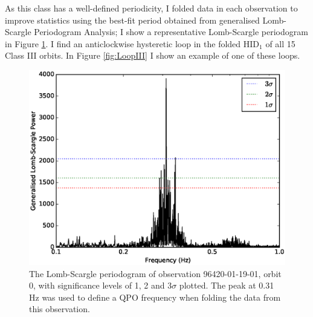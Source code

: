 \par As this class has a well-defined periodicity, I folded data in each observation to improve statistics using the best-fit period obtained from generalised Lomb-Scargle Periodogram Analysis; I show a representative Lomb-Scargle periodogram in Figure \ref{fig:IIILS}.  I find an anticlockwise hysteretic loop in the folded HID$_1$ of all 15 Class III orbits.  In Figure \ref{fig:LoopIII} I show an example of one of these loops.

\begin{figure}
    \includegraphics[width=\columnwidth, trim = 0mm 0mm 0mm 0mm]{images/LSVIII.eps}
    \captionsetup{singlelinecheck=off}
    \caption[The Lomb-Scargle periodogram of Class III observation 96420-01-19-01]{The Lomb-Scargle periodogram of observation 96420-01-19-01, orbit 0, with significance levels of 1, 2 and 3$\sigma$ plotted.  The peak at 0.31\,Hz was used to define a QPO frequency when folding the data from this observation.}
   \label{fig:IIILS}
\end{figure}

